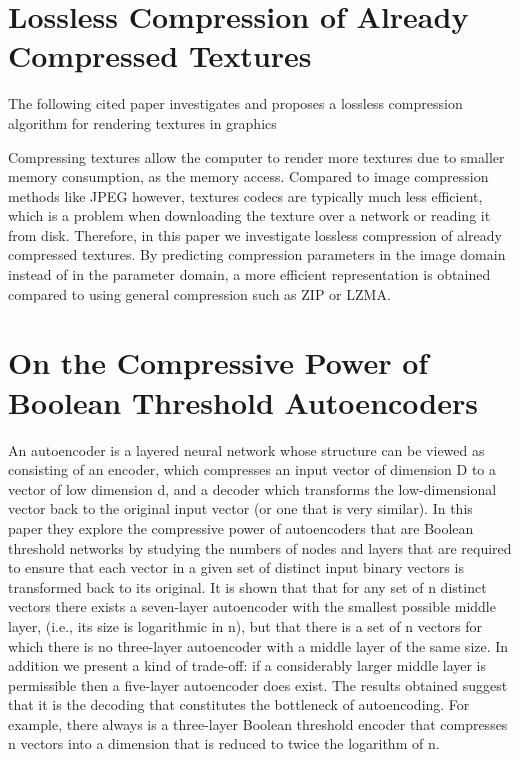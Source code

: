 \documentclass{article}
\begin{document}
\section{Lossless Compression of Already Compressed Textures \cite{strom2011lossless}}

The following cited paper investigates and proposes a lossless compression algorithm for rendering textures in graphics

Compressing textures allow the computer to render more textures due to smaller memory consumption, as the memory access. Compared to image compression methods like JPEG however, textures codecs are typically much less efficient, which is a problem when downloading the texture over a network or reading it from disk. Therefore, in this paper we investigate lossless compression of already compressed textures. By predicting compression parameters in the image domain instead of in the parameter domain, a more efficient representation is obtained compared to using general compression such as ZIP or LZMA.



\section{On the Compressive Power of Boolean Threshold Autoencoders \cite{melkman2020compressive}}

An autoencoder is a layered neural network whose structure can be viewed as consisting of an encoder, which compresses an input vector of dimension D to a vector of low dimension d, and a decoder which transforms the low-dimensional vector back to the original input vector (or one that is very similar). In this paper they explore the compressive power of autoencoders that are Boolean threshold networks by studying the numbers of nodes and layers that are required to ensure that each vector in a given set of distinct input binary vectors is transformed back to its original\cite{ackley1985learning}. It is shown that that for any set of n distinct vectors there exists a seven-layer autoencoder with the smallest possible middle layer, (i.e., its size is logarithmic in n), but that there is a set of n vectors for which there is no three-layer autoencoder with a middle layer of the same size. In addition we present a kind of trade-off: if a considerably larger middle layer is permissible then a five-layer autoencoder does exist. The results obtained suggest that it is the decoding that constitutes the bottleneck of autoencoding. For example, there always is a three-layer Boolean threshold encoder that compresses n vectors into a dimension that is reduced to twice the logarithm of n.\cite{anderson1988neurocomputing} \cite{kingma2013auto} \cite{doersch2016tutorial}
\end{document}
